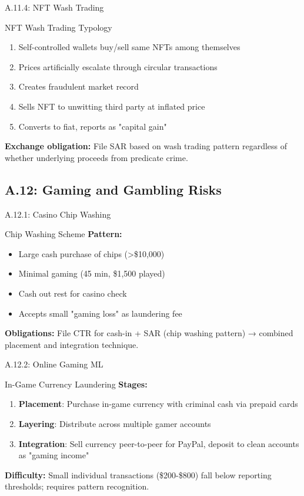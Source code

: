 \documentclass{beamer}
\begin{document}
	\begin{frame}{A.11.4: NFT Wash Trading}
		\begin{block}{NFT Wash Trading Typology}
			\begin{enumerate}
				\item Self-controlled wallets buy/sell same NFTs among themselves
				\item Prices artificially escalate through circular transactions
				\item Creates fraudulent market record
				\item Sells NFT to unwitting third party at inflated price
				\item Converts to fiat, reports as "capital gain"
			\end{enumerate}
		\end{block}
		\textbf{Exchange obligation:} File SAR based on wash trading pattern regardless of whether underlying proceeds from predicate crime.
	\end{frame}
	
	\subsection{A.12: Gaming and Gambling Risks}
	
	\begin{frame}{A.12.1: Casino Chip Washing}
		\begin{block}{Chip Washing Scheme}
			\textbf{Pattern:}
			\begin{itemize}
				\item Large cash purchase of chips (>\$10,000)
				\item Minimal gaming (45 min, \$1,500 played)
				\item Cash out rest for casino check
				\item Accepts small "gaming loss" as laundering fee
			\end{itemize}
		\end{block}
		\textbf{Obligations:} File CTR for cash-in + SAR (chip washing pattern) → combined placement and integration technique.
	\end{frame}
	
	\begin{frame}{A.12.2: Online Gaming ML}
		\begin{block}{In-Game Currency Laundering}
			\textbf{Stages:}
			\begin{enumerate}
				\item \textbf{Placement}: Purchase in-game currency with criminal cash via prepaid cards
				\item \textbf{Layering}: Distribute across multiple gamer accounts
				\item \textbf{Integration}: Sell currency peer-to-peer for PayPal, deposit to clean accounts as "gaming income"
			\end{enumerate}
		\end{block}
		\textbf{Difficulty:} Small individual transactions (\$200-\$800) fall below reporting thresholds; requires pattern recognition.
	\end{frame}
	
\end{document}
